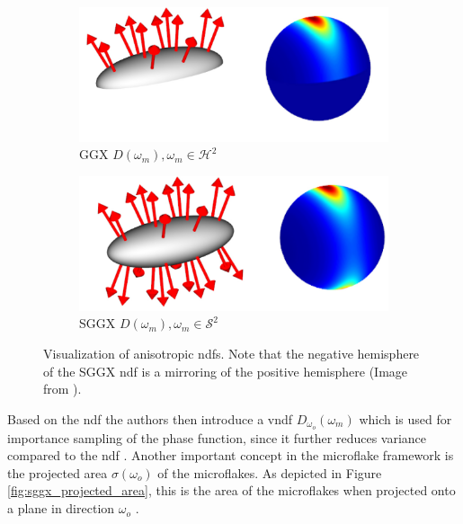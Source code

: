 \begin{figure}[t]
    \centering
    \begin{subfigure}[b]{0.45\linewidth}
        \centering
        \includegraphics[width=\linewidth]{img/sggx_ndf_a.jpg}
        \caption{GGX $D(\omega_m), \omega_m \in \mathcal{H}^2$}
        \label{fig:sggx_ndf_a}
    \end{subfigure}
    \begin{subfigure}[b]{0.45\linewidth}
        \centering
        \includegraphics[width=1\linewidth]{img/sggx_ndf_b.jpg}
        \caption{SGGX $D(\omega_m), \omega_m \in \mathcal{S}^2$}
        \label{fig:sggx_ndf_b}
    \end{subfigure}
	\caption[Visualization of anisotropic \acsp{ndf}]{Visualization of anisotropic \acsp{ndf}. Note that the negative hemisphere of the SGGX \acs{ndf} is a mirroring of the positive hemisphere (Image from \cite{sggx}).}
	\label{fig:sggx_ndf}
\end{figure}
Based on the \acs{ndf} the authors then introduce a \ac{vndf} $D_{\omega_o}(\omega_m)$ which is used for importance sampling of the phase function, since it further reduces variance compared to the \acs{ndf} \cite{vndf_importance_sampling}.
Another important concept in the microflake framework is the projected area $\sigma(\omega_o)$ of the microflakes.
As depicted in Figure \ref{fig:sggx_projected_area}, this is the area of the microflakes when projected onto a plane in direction $\omega_o$ \cite{sggx}.
